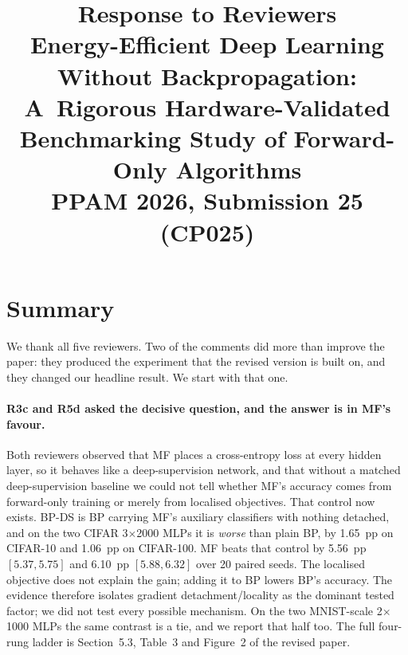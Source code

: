 \documentclass[11pt,a4paper]{article}
\title{\vspace{-1.5cm}Response to Reviewers\\[2pt]
  \large Energy-Efficient Deep Learning Without Backpropagation:\\
  A~Rigorous Hardware-Validated Benchmarking Study of Forward-Only Algorithms\\[4pt]
  \normalsize PPAM 2026, Submission 25 (CP025)}
\author{}
\date{}
\newcommand{\MF}{MF}
\newcommand{\BP}{BP}
\newcommand{\BPDS}{BP-DS}
\begin{document}
\maketitle
\vspace{-1.2cm}

\section*{Summary}

We thank all five reviewers. Two of the comments did more than improve the
paper: they produced the experiment that the revised version is built on, and
they changed our headline result. We start with that one.

\paragraph{R3c and R5d asked the decisive question, and the answer is in
\MF{}'s favour.}
Both reviewers observed that \MF{} places a cross-entropy loss at every hidden
layer, so it behaves like a deep-supervision network, and that without a
matched deep-supervision baseline we could not tell whether \MF{}'s accuracy
comes from forward-only training or merely from localised objectives. That
control now exists. \BPDS{} is \BP{} carrying \MF{}'s auxiliary classifiers
with nothing detached, and on the two CIFAR \num{3}$\times$\num{2000} MLPs it
is \emph{worse} than plain \BP{}, by \num{1.65}~pp on CIFAR-10 and
\num{1.06}~pp on CIFAR-100. \MF{} beats that control by \num{5.56}~pp
$[\num{+5.37},\num{+5.75}]$ and \num{6.10}~pp $[\num{+5.88},\num{+6.32}]$ over
\num{20} paired seeds. The localised objective does not explain the gain;
adding it to \BP{} lowers \BP{}'s accuracy. The evidence therefore isolates
gradient detachment/locality as the dominant tested factor; we did not test
every possible mechanism. On the two MNIST-scale
\num{2}$\times$\num{1000} MLPs the same contrast is a tie, and we report that
half too. The full four-rung ladder is Section~5.3,
Table~3 and Figure~2 of the revised paper.
\end{document}
